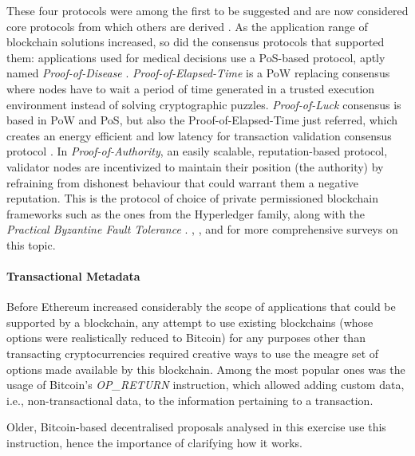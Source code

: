 \documentclass[../access.tex]{subfiles}
\begin{document}
                These four protocols were among the first to be suggested and are now considered core protocols from which others are derived \cite{Zhang2020a}. As the application range of blockchain solutions increased, so did the consensus protocols that supported them: applications used for medical decisions use a PoS-based protocol, aptly named \textit{Proof-of-Disease} \cite{Patel2019}. \textit{Proof-of-Elapsed-Time} is a PoW replacing consensus where nodes have to wait a period of time generated in a trusted execution environment \cite{Bowman2021} instead of solving cryptographic puzzles. \textit{Proof-of-Luck} consensus is based in PoW and PoS, but also the Proof-of-Elapsed-Time just referred, which creates an energy efficient and low latency for transaction validation consensus protocol \cite{Milutinovic2016}. In \textit{Proof-of-Authority}, an easily scalable, reputation-based protocol, validator nodes are incentivized to maintain their position (the authority) by refraining from dishonest behaviour that could warrant them a negative reputation. This is the protocol of choice of private permissioned blockchain frameworks such as the ones from the Hyperledger family, along with the \textit{Practical Byzantine Fault Tolerance} \cite{Joshi2021}. \cite{Bouraga2021}, \cite{Zhang2020a}, and \cite{Xiao2020} for more comprehensive surveys on this topic.

        \paragraph{Transactional Metadata}
        \label{transactional_metadata}
            Before Ethereum increased considerably the scope of applications that could be supported by a blockchain, any attempt to use existing blockchains (whose options were realistically reduced to Bitcoin) for any purposes other than transacting cryptocurrencies required creative ways to use the meagre set of options made available by this blockchain. Among the most popular ones was the usage of Bitcoin's \textit{OP\_RETURN} instruction, which allowed adding custom data, i.e., non-transactional data, to the information pertaining to a transaction.
            \par
            Older, Bitcoin-based decentralised proposals analysed in this exercise use this instruction, hence the importance of clarifying how it works.
            
\end{document}
